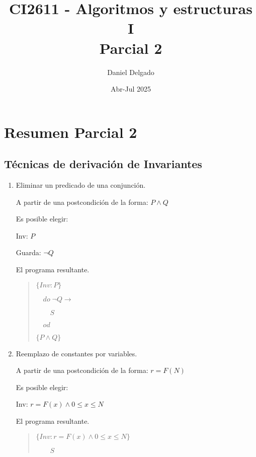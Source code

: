 \documentclass[hidelinks]{article}
\title{CI2611 - Algoritmos y estructuras I \\ Parcial 2}
\date{Abr-Jul 2025}
\author{Daniel Delgado}
\newenvironment{absolutelynopagebreak}
{\Needspace{10\baselineskip}\begin{quote}}
		{\end{quote}}
\begin{document}
\maketitle

\tableofcontents

\newpage

\section{Resumen Parcial 2}

\subsection{Técnicas de derivación de Invariantes}\par

\begin{enumerate}
	\item Eliminar un predicado de una conjunción.\par
	      A partir de una postcondición de la forma: $P \land Q$\par
	      Es posible elegir:\par
	      Inv: $P$\par
	      Guarda: $\neg Q$\par
	      El programa resultante.\par
	      \begin{absolutelynopagebreak}
		      $\{Inv: P\}$\par
		      $\quad do \; \neg Q \rightarrow$\par
		      $\qquad S$\par
		      $\quad od$\par
		      $\{P \land Q\}$\par
	      \end{absolutelynopagebreak}
	\item Reemplazo de constantes por variables.\par
	      A partir de una postcondición de la forma: $r = F(N)$\par
	      Es posible elegir:\par
	      Inv: $r = F(x) \land 0 \leq x \leq N$\par
	      El programa resultante.\par
	      \begin{absolutelynopagebreak}
		      $\{Inv: r = F(x) \land 0 \leq x \leq N\}$\par
		      $\qquad S$\par

\end{absolutelynopagebreak}
\end{enumerate}
\end{document}
